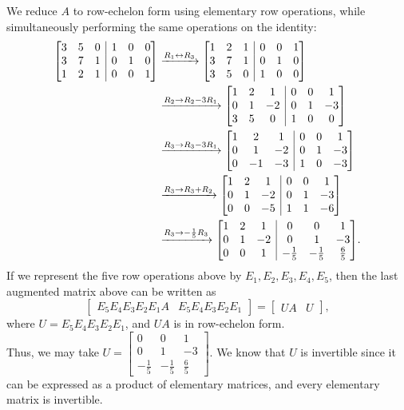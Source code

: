 \documentclass[12pt]{article}
\makeatletter
\newenvironment{aamatrix}[1]{%
  \left[\begin{array}{@{}*{#1}{c}|*{#1}{c}@{}}
}{%
  \end{array}\right]
}
\newcommand{\bbm}{\begin{bmatrix}}
\newcommand{\ebm}{\end{bmatrix}}
\makeatother
\begin{document}
\begin{enumerate}
\medskip

We reduce $A$ to row-echelon form using elementary row operations, while simultaneously performing the same operations on the identity:
\begin{align*}
 \begin{aamatrix}{3}
  3&5&0&1&0&0\\3&7&1&0&1&0\\1&2&1&0&0&1
 \end{aamatrix} &\xrightarrow{R_1\leftrightarrow R_3}\begin{aamatrix}{3}
  1&2&1&0&0&1\\3&7&1&0&1&0\\3&5&0&1&0&0
 \end{aamatrix}\\
&\xrightarrow{R_2\to R_2-3R_1} \begin{aamatrix}{3}
                                1&2&1&0&0&1\\0&1&-2&0&1&-3\\3&5&0&1&0&0
                               \end{aamatrix}\\
&\xrightarrow{R_3\to R_3-3R_1} \begin{aamatrix}{3}
                                1&2&1&0&0&1\\0&1&-2&0&1&-3\\0&-1&-3&1&0&-3
                               \end{aamatrix}\\
&\xrightarrow{R_3\to R_3+R_2} \begin{aamatrix}{3}
                               1&2&1&0&0&1\\0&1&-2&0&1&-3\\0&0&-5&1&1&-6
                              \end{aamatrix}\\
&\xrightarrow{R_3\to -\frac{1}{5}R_3} \begin{aamatrix}{3}
                                       1&2&1&0&0&1\\0&1&-2&0&1&-3\\0&0&1&-\frac{1}{5}&-\frac{1}{5}&\frac{6}{5}
                                      \end{aamatrix}.
\end{align*}
If we represent the five row operations above by $E_1,E_2,E_3,E_4,E_5$, then the last augmented matrix above can be written as
\[
 [\begin{array}{c|c}
   E_5E_4E_3E_2E_1A & E_5E_4E_3E_2E_1
  \end{array}] = [\begin{array}{c|c}UA&U\end{array}],
\]
where $U=E_5E_4E_3E_2E_1$, and $UA$ is in row-echelon form. \\Thus, we may take $U = \bbm 0&0&1\\0&1&-3\\-\frac{1}{5}&-\frac{1}{5}&\frac{6}{5}\ebm$. We know that $U$ is invertible since it can be expressed as a product of elementary matrices, and every elementary matrix is invertible.


\end{enumerate}
\end{document}
